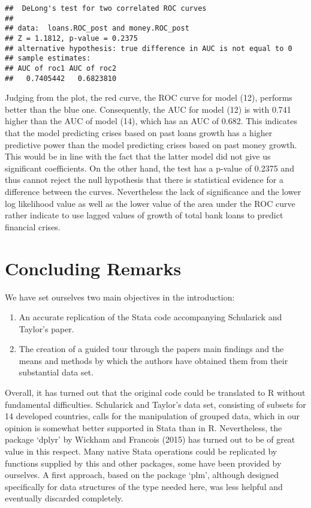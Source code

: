 \documentclass[a4paper,11pt,abstract=on]{scrartcl}
\begin{document}
{{\small
\begin{verbatim}
##  DeLong's test for two correlated ROC curves
## 
## data:  loans.ROC_post and money.ROC_post
## Z = 1.1812, p-value = 0.2375
## alternative hypothesis: true difference in AUC is not equal to 0
## sample estimates:
## AUC of roc1 AUC of roc2 
##   0.7405442   0.6823810
\end{verbatim}
}

Judging from the plot, the red curve, the ROC curve for model (12),
performs better than the blue one. Consequently, the AUC for model (12)
is with 0.741 higher than the AUC of model (14), which has an AUC of
0.682. This indicates that the model predicting crises based on past
loans growth has a higher predictive power than the model predicting
crises based on past money growth. This would be in line with the fact
that the latter model did not give us significant coefficients. On the
other hand, the test has a p-value of 0.2375 and thus cannot reject the
null hypothesis that there is statistical evidence for a difference
between the curves. Nevertheless the lack of significance and the lower
log likelihood value as well as the lower value of the area under the
ROC curve rather indicate to use lagged values of growth of total bank
loans to predict financial crises.

\eject
}
\section{Concluding Remarks}
We have set ourselves two main objectives in the introduction:

\begin{enumerate}
\item An accurate replication of the Stata code accompanying Schularick and Taylor’s paper.
\item The creation of a guided tour through the papers main findings and the means and methods by which the authors have obtained them from their substantial data set.
\end{enumerate}

Overall, it has turned out that the original code could be translated to R without fundamental difficulties. Schularick and Taylor’s data set, consisting of subsets for 14 developed countries, calls for the manipulation of grouped data, which in our opinion is somewhat better supported in Stata than in R. Nevertheless, the package ‘dplyr’ by Wickham and Francois (2015) has turned out to be of great value in this respect. Many native Stata operations could be replicated by functions supplied by this and other packages, some have been provided by ourselves. A first approach, based on the package ‘plm’, although designed specifically for data structures of the type needed here, was less helpful and eventually discarded completely.
\end{document}
